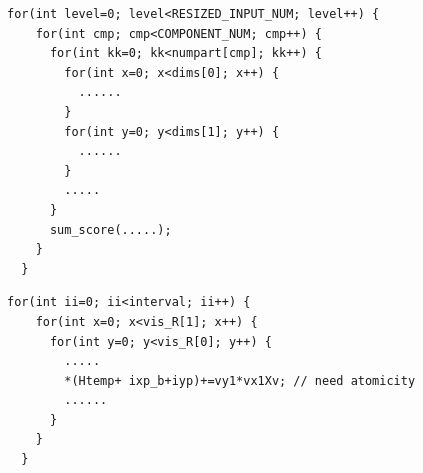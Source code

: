 \begin{lstlisting}[caption=The program structure of region detection, label=lst:detect]
  for(int level=0; level<RESIZED_INPUT_NUM; level++) {
    for(int cmp; cmp<COMPONENT_NUM; cmp++) {
      for(int kk=0; kk<numpart[cmp]; kk++) {
        for(int x=0; x<dims[0]; x++) {
          ......
        }
        for(int y=0; y<dims[1]; y++) {
          ......
        }
        .....
      }
      sum_score(.....);
    }
  }
\end{lstlisting}

\begin{lstlisting}[caption=The program structure of HOG calculation, label=lst:hog]
  for(int ii=0; ii<interval; ii++) {
    for(int x=0; x<vis_R[1]; x++) {
      for(int y=0; y<vis_R[0]; y++) {
        .....
        *(Htemp+ ixp_b+iyp)+=vy1*vx1Xv; // need atomicity
        ......
      }
    }
  }
\end{lstlisting}